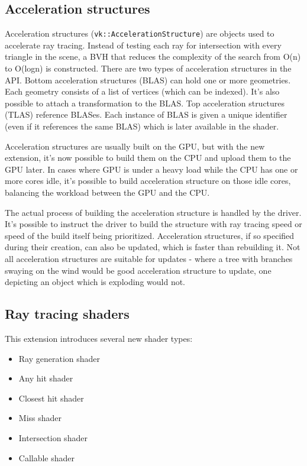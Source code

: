 \documentclass[times, utf8, zavrsni, numeric]{fer}
\begin{document}
\subsection{Acceleration structures}
Acceleration structures (\texttt{vk::AccelerationStructure}) are objects used to accelerate ray tracing. Instead of testing each ray for intersection with every triangle in the scene, a BVH that reduces the complexity of the search from O(n) to O(logn) is constructed. There are two types of acceleration structures in the API. Bottom acceleration structures (BLAS) can hold one or more geometries. Each geometry consists of a list of vertices (which can be indexed). It's also possible to attach a transformation to the BLAS. Top acceleration structures (TLAS) reference BLASes. Each instance of BLAS is given a unique identifier (even if it references the same BLAS) which is later available in the shader.

Acceleration structures are usually built on the GPU, but with the new extension, it's now possible to build them on the CPU and upload them to the GPU later. In cases where GPU is under a heavy load while the CPU has one or more cores idle, it's possible to build acceleration structure on those idle cores, balancing the workload between the GPU and the CPU.

The actual process of building the acceleration structure is handled by the driver. It's possible to instruct the driver to build the structure with ray tracing speed or speed of the build itself being prioritized. Acceleration structures, if so specified during their creation, can also be updated, which is faster than rebuilding it. Not all acceleration structures are suitable for updates - where a tree with branches swaying on the wind would be good acceleration structure to update, one depicting an object which is exploding would not.

\subsection{Ray tracing shaders}
This extension introduces several new shader types:
\begin{itemize}
\item{Ray generation shader}
\item{Any hit shader}
\item{Closest hit shader}
\item{Miss shader}
\item{Intersection shader}
\item{Callable shader}
\end{itemize}
\end{document}

